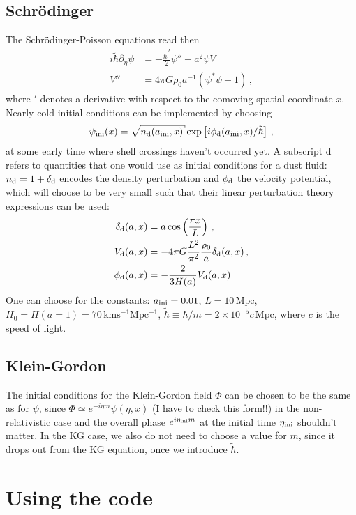\documentclass[amsmath,amssymb,12pt, eqsecnum]{revtex4}
\begin{document}
\subsection{Schr\"odinger}
The Schr\"odinger-Poisson equations read then
\begin{align}
i \tilde{\hbar} \partial_\eta  \psi &= - \frac{\tilde{\hbar}^2}{2 } \psi'' + a^2 \psi V\\
V'' &=  4 \pi G \rho_0 a^{-1} (\psi^* \psi -1)\,,
\end{align}
where $'$ denotes a derivative with respect to the comoving spatial coordinate $x$. Nearly cold initial conditions can be implemented by choosing 
\begin{equation}\label{inipsi}
\psi_{\rm{ini}}(x)= \sqrt{n_{\rm d}(a_{\rm{ini}},x)} \exp\left[ i \phi_{\rm d}(a_{\rm{ini}},x)/\tilde \hbar \right]\,,
\end{equation}
at some early time where shell crossings haven't occurred yet. A subscript d refers to quantities that one would use as initial conditions for a dust fluid: $n_{\rm d} = 1 + \delta_{\rm d}$ encodes the density perturbation and $\phi_{\rm d}$ the velocity potential, which will choose to be very small such that their linear perturbation theory expressions can be used:
\begin{align} \label{delini}
\delta_{\rm d}(a,x) &= a \cos\left(\frac{\pi x}{L}\right) \,,\\
V_{\rm d}(a,x) &= -  4 \pi G \frac{L^2}{\pi^2} \frac{\rho_0}{a}  \delta_{\rm d}(a,x) \,,\\
\phi_{\rm d}(a,x) &= -\frac{2}{3 H(a)}V_{\rm d}(a,x)
\end{align}
One can choose for the constants: $a_{\rm ini} =0.01$, $L=10\,\mathrm{Mpc}$, $H_0 = H(a=1) = 70\,\mathrm{km s^{-1} Mpc^{-1}}$, $\tilde \hbar\equiv \hbar/m = 2\times 10^{-5} c\, \mathrm{Mpc}$, where $c$ is the speed of light.
\subsection{Klein-Gordon}
The initial conditions for the Klein-Gordon field $\Phi$ can be chosen to be the same as for $\psi$, since $\Phi \simeq e^{- i \eta m} \psi(\eta, x)$ (I have to check this form!!) in the non-relativistic case and the overall phase $e^{i \eta_{\rm ini} m}$ at the initial time $\eta_{\rm ini}$ shouldn't matter. In the KG case, we also do not need to choose a value for $m$, since it drops out from the KG equation, once we introduce $\tilde \hbar$.
\appendix
\section{Using the code}
\end{document}
